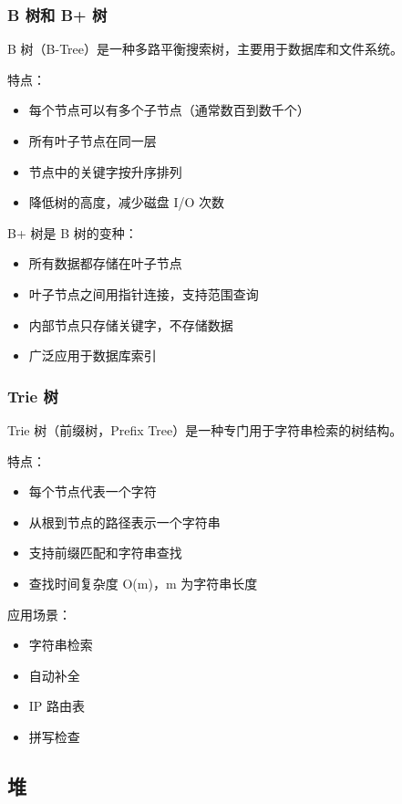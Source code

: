 \subsubsection{B 树和 B+ 树}

B 树（B-Tree）是一种多路平衡搜索树，主要用于数据库和文件系统。

特点：
\begin{itemize}
  \item 每个节点可以有多个子节点（通常数百到数千个）
  \item 所有叶子节点在同一层
  \item 节点中的关键字按升序排列
  \item 降低树的高度，减少磁盘 I/O 次数
\end{itemize}

B+ 树是 B 树的变种：
\begin{itemize}
  \item 所有数据都存储在叶子节点
  \item 叶子节点之间用指针连接，支持范围查询
  \item 内部节点只存储关键字，不存储数据
  \item 广泛应用于数据库索引
\end{itemize}

\subsubsection{Trie 树}

Trie 树（前缀树，Prefix Tree）是一种专门用于字符串检索的树结构。

特点：
\begin{itemize}
  \item 每个节点代表一个字符
  \item 从根到节点的路径表示一个字符串
  \item 支持前缀匹配和字符串查找
  \item 查找时间复杂度 O(m)，m 为字符串长度
\end{itemize}

应用场景：
\begin{itemize}
  \item 字符串检索
  \item 自动补全
  \item IP 路由表
  \item 拼写检查
\end{itemize}

\subsection{堆}

